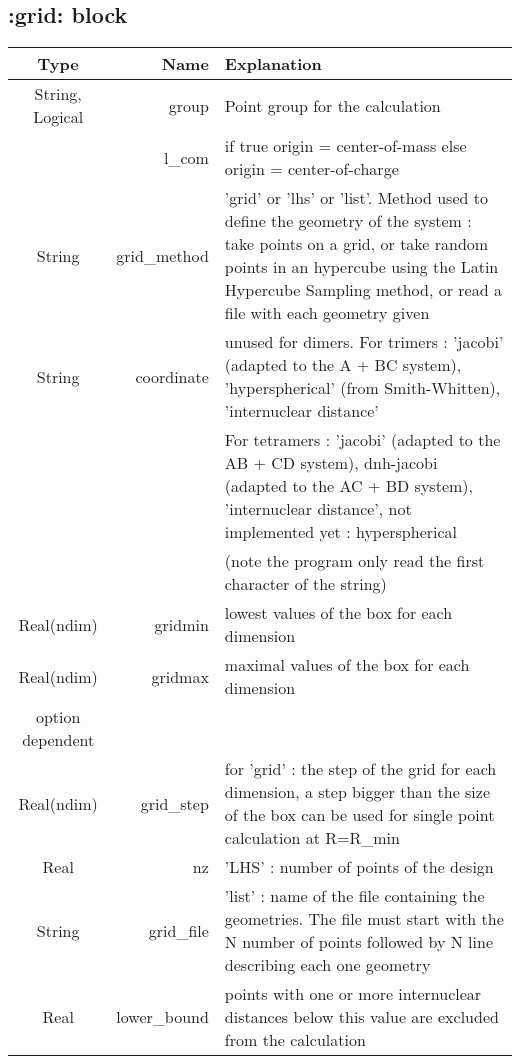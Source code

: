 \documentclass[a4paper,10pt]{article}
\begin{document}
\subsection{:grid: block}

\begin{tabular}{|crp{110mm}|}         \hline
\bf{Type} & \bf{Name} & \hspace{4cm}\bf{Explanation}\\ \hline
String, Logical & group& Point group for the calculation \\
 & l\_com & if true origin = center-of-mass else origin = center-of-charge\\ \hline
String & grid\_method & 'grid' or 'lhs' or 'list'. Method used to define the geometry of the system : take points on a grid, or take random points in an hypercube using the Latin Hypercube Sampling method, or read a file with each geometry given \\ \hline
String & coordinate & unused for dimers. For trimers : 'jacobi' (adapted to the A + BC system), 'hyperspherical' (from Smith-Whitten), 'internuclear distance'\\ 
 &  &  For tetramers : 'jacobi' (adapted to the AB + CD system), dnh-jacobi (adapted to the AC + BD system), 'internuclear distance', not implemented yet : hyperspherical \\
 & & (note the program only read the first character of the string)\\ \hline
Real(ndim) & gridmin & lowest values of the box for each dimension\\ \hline
Real(ndim) & gridmax & maximal values of the box for each dimension \\ \hline
option dependent & & \\ 
Real(ndim) & grid\_step & for 'grid' : the step of the grid for each dimension, a step bigger than the size of the box can be used for single point calculation at R=R\_min \\ 
Real & nz & 'LHS' : number of points of the design \\
String & grid\_file & 'list' : name of the file containing the geometries. The file must start with the N number of points followed by N line describing each one geometry\\ \hline
Real & lower\_bound & points with one or more internuclear distances below this value are excluded from the calculation \\ \hline 
\end{tabular}
\end{document}
